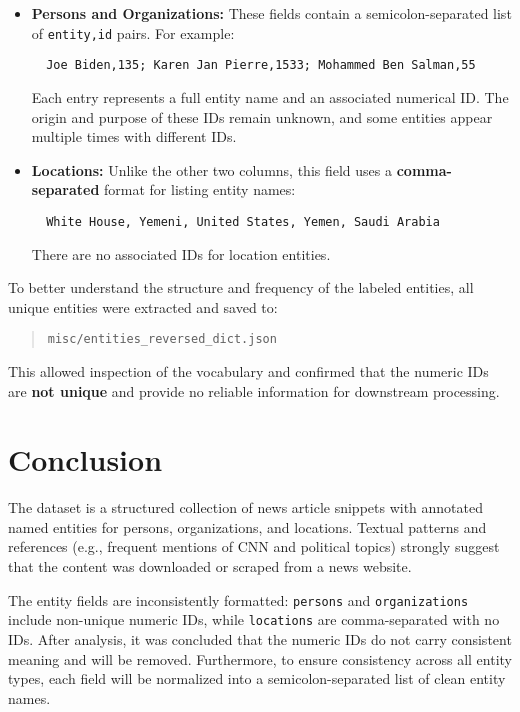 \begin{itemize}
  \item \textbf{Persons and Organizations:}  
  These fields contain a semicolon-separated list of \texttt{entity,id} pairs. For example:
  \begin{verbatim}
  Joe Biden,135; Karen Jan Pierre,1533; Mohammed Ben Salman,55
  \end{verbatim}
  Each entry represents a full entity name and an associated numerical ID. The origin and purpose of these IDs remain unknown, and some entities appear multiple times with different IDs.

  \item \textbf{Locations:}  
  Unlike the other two columns, this field uses a \textbf{comma-separated} format for listing entity names:
  \begin{verbatim}
  White House, Yemeni, United States, Yemen, Saudi Arabia
  \end{verbatim}
  There are no associated IDs for location entities.
\end{itemize}

To better understand the structure and frequency of the labeled entities, all unique entities were extracted and saved to:
\begin{quote}
\texttt{misc/entities\_reversed\_dict.json}
\end{quote}
This allowed inspection of the vocabulary and confirmed that the numeric IDs are \textbf{not unique} and provide no reliable information for downstream processing.



\section{Conclusion}

The dataset is a structured collection of news article snippets with annotated named entities for persons, organizations, and locations. Textual patterns and references (e.g., frequent mentions of CNN and political topics) strongly suggest that the content was downloaded or scraped from a news website.

The entity fields are inconsistently formatted: \texttt{persons} and \texttt{organizations} include non-unique numeric IDs, while \texttt{locations} are comma-separated with no IDs. After analysis, it was concluded that the numeric IDs do not carry consistent meaning and will be removed. Furthermore, to ensure consistency across all entity types, each field will be normalized into a semicolon-separated list of clean entity names.

